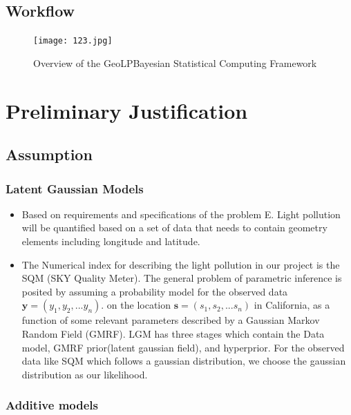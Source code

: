 \documentclass{mcmthesis}
\begin{document}
\subsection{Workflow}

\begin{figure}[htp]
    \centering
    \texttt{[image: 123.jpg]}
    \caption{Overview of the GeoLPBayesian Statistical Computing Framework}
    \label{fig:my_label}
\end{figure}

\section{Preliminary Justification}

\subsection{Assumption}
\subsubsection{Latent Gaussian Models}

\begin{itemize}

    \item Based on requirements and specifications of the problem E. Light pollution will be quantified based on a set of data that needs to contain geometry elements including longitude and latitude. 

    \item The Numerical index for describing the light pollution in our project is the SQM (SKY Quality Meter). The general problem of parametric inference is posited by assuming a probability model for the observed data $\mathbf{y}=(y_1,y_2,...y_n)$. on the location $\mathbf{s}=(s_1,s_2,...s_n)$ in California, as a function of some relevant parameters described by a Gaussian Markov Random Field (GMRF). LGM has three stages which contain the Data model, GMRF prior(latent gaussian field), and hyperprior. For the observed data like SQM which follows a gaussian distribution, we choose the gaussian distribution as our likelihood. 
\end{itemize}

\subsubsection{Additive models} 
\end{document}
